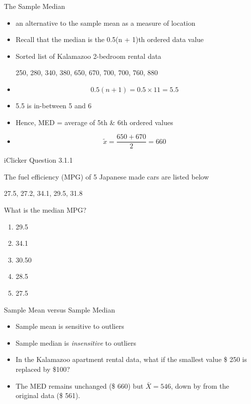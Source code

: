 \documentclass[14pt]{beamer}\usepackage[]{graphicx}\usepackage[]{color}
\begin{document}
\begin{frame}[fragile]{The Sample Median}



{\footnotesize{
\begin{itemize}
\item<1-> an alternative to the sample mean as a measure of location

\item<1-> Recall that the median is the 0.5(n + 1)th ordered data value

\item<1-> Sorted list of Kalamazoo 2-bedroom rental data

\vspace{3mm}

250, 280, 340, 380, 650, 670, 700, 700, 760, 880
\item<2->
\begin{equation*}
0.5(n + 1) = 0.5 \times 11 = 5.5
\end{equation*}

\item<3-> 5.5 is in-between 5 and 6
\item<4-> Hence, MED = average of 5th \& 6th ordered values
\item<5->
\begin{equation*}
\tilde{x} = \frac{ 650 + 670 }{2} = 660
\end{equation*}
\end{itemize}
}}
\end{frame}

\begin{frame}[fragile]{iClicker Question 3.1.1}


The fuel efficiency (MPG) of 5 Japanese made cars are listed below

\begin{center}
27.5, 27.2, 34.1, 29.5, 31.8
\end{center}

What is the median MPG?

\begin{enumerate}
\item 29.5
\item 34.1
\item 30.50
\item 28.5
\item 27.5
\end{enumerate}
\end{frame}

\begin{frame}[fragile]{Sample Mean versus Sample Median}

\begin{itemize}
\item<1-> Sample mean is sensitive to outliers
\item<2-> Sample median is \textit{insensitive} to outliers
\item<3-> In the Kalamazoo apartment rental data, what if the smallest value \$ 250 is replaced by \$100?
\item<4-> The MED remains unchanged (\$ 660) but $\bar{X} = 546$, down by from the original data (\$ 561).
\end{itemize}
\end{frame}
\end{document}
